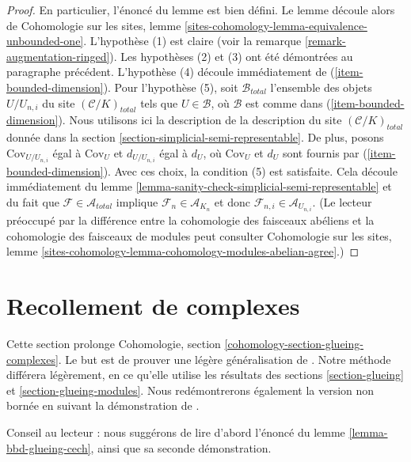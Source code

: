 \begin{proof}
\medskip\noindent
En particulier, l'énoncé du lemme est bien défini.
Le lemme découle alors de Cohomologie sur les sites,
lemme \ref{sites-cohomology-lemma-equivalence-unbounded-one}.
L'hypothèse (1) est claire (voir la remarque \ref{remark-augmentation-ringed}).
Les hypothèses (2) et (3) ont été démontrées au paragraphe précédent.
L'hypothèse (4) découle immédiatement de (\ref{item-bounded-dimension}).
Pour l'hypothèse (5), soit $\mathcal{B}_{total}$ l'ensemble des objets
$U/U_{n, i}$ du site $(\mathcal{C}/K)_{total}$
tels que $U \in \mathcal{B}$, où $\mathcal{B}$ est comme dans
(\ref{item-bounded-dimension}). Nous utilisons ici la description de
la description du site $(\mathcal{C}/K)_{total}$ donnée dans la section
\ref{section-simplicial-semi-representable}.
De plus, posons $\text{Cov}_{U/U_{n, i}}$ égal à $\text{Cov}_U$
et $d_{U/U_{n, i}}$ égal à $d_U$, où $\text{Cov}_U$ et $d_U$
sont fournis par (\ref{item-bounded-dimension}).
Avec ces choix, la condition (5) est satisfaite.
Cela découle immédiatement du lemme
\ref{lemma-sanity-check-simplicial-semi-representable}
et du fait que $\mathcal{F} \in \mathcal{A}_{total}$
implique $\mathcal{F}_n \in \mathcal{A}_{K_n}$ et donc
$\mathcal{F}_{n, i} \in \mathcal{A}_{U_{n, i}}$.
(Le lecteur préoccupé par la différence entre la cohomologie
des faisceaux abéliens et la cohomologie
des faisceaux de modules peut consulter Cohomologie sur les sites, lemme
\ref{sites-cohomology-lemma-cohomology-modules-abelian-agree}.)
\end{proof}










\section{Recollement de complexes}
\label{section-glueing-complexes}

\noindent
Cette section prolonge
Cohomologie, section \ref{cohomology-section-glueing-complexes}.
Le but est de prouver une légère généralisation de \cite[Theorem 3.2.4]{BBD}.
Notre méthode différera légèrement, en ce qu'elle utilise
les résultats des sections \ref{section-glueing} et
\ref{section-glueing-modules}. Nous redémontrerons également la
version non bornée en suivant la démonstration de \cite{six-I}.

\medskip\noindent
Conseil au lecteur : nous suggérons de lire d'abord l'énoncé du
lemme \ref{lemma-bbd-glueing-cech}, ainsi que sa seconde démonstration.

